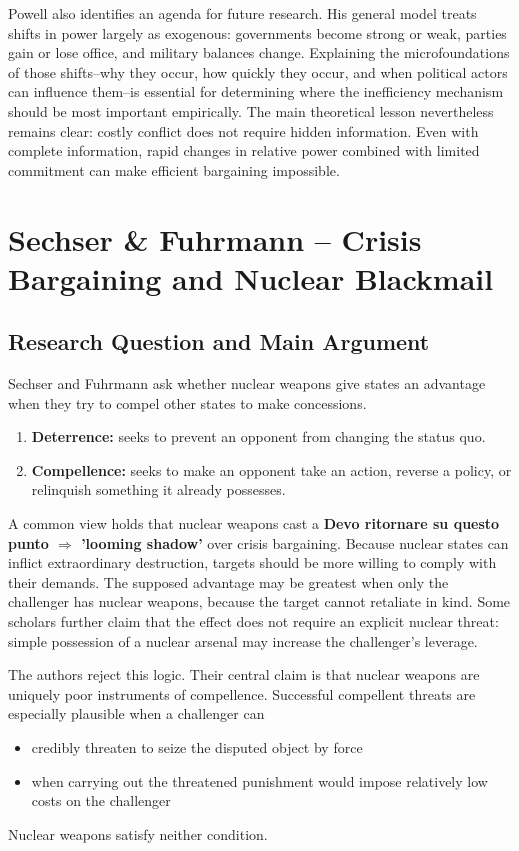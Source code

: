 Powell also identifies an agenda for future research. His general model treats shifts in power largely as exogenous: governments become strong or weak, parties gain or lose office, and military balances change. Explaining the microfoundations of those shifts--why they occur, how quickly they occur, and when political actors can influence them--is essential for determining where the inefficiency mechanism should be most important empirically. The main theoretical lesson nevertheless remains clear: costly conflict does not require hidden information. Even with complete information, rapid changes in relative power combined with limited commitment can make efficient bargaining impossible.

\clearpage

\section{Sechser \& Fuhrmann -- Crisis Bargaining and Nuclear Blackmail}

\subsection{Research Question and Main Argument}

Sechser and Fuhrmann ask whether nuclear weapons give states an advantage when they try to compel other states to make concessions.

\begin{enumerate}
    \item \textbf{Deterrence:} seeks to prevent an opponent from changing the status quo.
    \item \textbf{Compellence:} seeks to make an opponent take an action, reverse a policy, or relinquish something it already possesses.
\end{enumerate}

A common view holds that nuclear weapons cast a \textbf{Devo ritornare su questo punto $\Rightarrow$ 'looming shadow'} over crisis bargaining. Because nuclear states can inflict extraordinary destruction, targets should be more willing to comply with their demands. The supposed advantage may be greatest when only the challenger has nuclear weapons, because the target cannot retaliate in kind. Some scholars further claim that the effect does not require an explicit nuclear threat: simple possession of a nuclear arsenal may increase the challenger's leverage.

The authors reject this logic. Their central claim is that nuclear weapons are uniquely poor instruments of compellence. Successful compellent threats are especially plausible when a challenger can
\begin{itemize}
    \item credibly threaten to seize the disputed object by force
    \item when carrying out the threatened punishment would impose relatively low costs on the challenger
\end{itemize}
Nuclear weapons satisfy neither condition.

